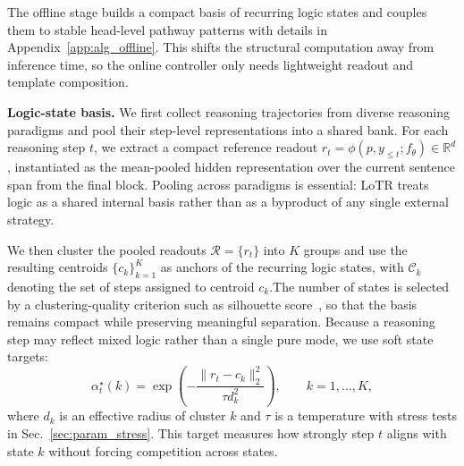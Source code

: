 The offline stage builds a compact basis of recurring logic states and couples them to stable head-level pathway patterns with details in Appendix~\ref{app:alg_offline}. This shifts the structural computation away from inference time, so the online controller only needs lightweight readout and template composition.

\vspace{-0.5mm}
\textbf{Logic-state basis.}
We first collect reasoning trajectories from diverse reasoning paradigms and pool their step-level representations into a shared bank. For each reasoning step $t$, we extract a compact reference readout $r_t=\phi(p,y_{\le t};f_\theta)\in\mathbb{R}^d$, instantiated as the mean-pooled hidden representation over the current sentence span from the final block. 
Pooling across paradigms is essential: LoTR treats logic as a shared internal basis rather than as a byproduct of any single external strategy.

We then cluster the pooled readouts $\mathcal{R}=\{r_t\}$ into $K$ groups and use the resulting centroids $\{c_k\}_{k=1}^K$ as anchors of the recurring logic states, with $\mathcal{C}_k$ denoting the set of steps assigned to centroid $c_k$.The number of states is selected by a clustering-quality criterion such as silhouette score~\citep{rousseeuw1987silhouettes}, so that the basis remains compact while preserving meaningful separation. Because a reasoning step may reflect mixed logic rather than a single pure mode, we use soft state targets:
\begin{equation}
\alpha_t^\star(k)=\exp\!\left(-\frac{\|r_t-c_k\|_2^2}{\tau d_k^2}\right), \qquad k=1,\dots,K,
\label{eq:lotr_soft_target}
\end{equation}
where $d_k$ is an effective radius of cluster $k$ and $\tau$ is a temperature with stress tests in Sec.~\ref{sec:param_stress}. This target measures how strongly step $t$ aligns with state $k$ without forcing competition across states.
\vspace{-0.5mm}

